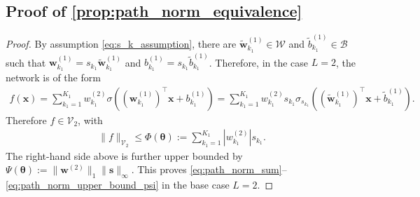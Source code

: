 \documentclass{article}
\def\vtheta{{\bm{\theta}}}
\def\vs{{\bm{s}}}
\def\vw{{\bm{w}}}
\def\vx{{\bm{x}}}
\def\cB{{\mathcal{B}}}
\def\cV{{\mathcal{V}}}
\def\cW{{\mathcal{W}}}
\begin{document}
\begin{appendices}
\subsection{Proof of \cref{prop:path_norm_equivalence}} \label{appendix:proof_path_norm_equivalence}
\begin{proof}
    By assumption \eqref{eq:s_k_assumption}, there are $\widetilde{\vw}_{k_1}^{(1)} \in \cW$ and $\widetilde{b}_{k_1}^{(1)} \in \cB$ such that $\vw_{k_1}^{(1)} = s_{k_1} \widetilde{\vw}_{k_1}^{(1)}$ and $b_{k_1}^{(1)} = s_{k_1} \widetilde{b}_{k_1}^{(1)}$. Therefore, in the case $L = 2$, the network is of the form
    \begin{align} \label{eq:f_L_sigma_scaled}
        f(\vx) = \sum_{k_1=1}^{K_1} w_{k_1}^{(2)} \sigma \left( (\vw_{k_1}^{(1)})^\top \vx + b_{k_1}^{(1)} \right) = \sum_{k_1=1}^{K_1} w_{k_1}^{(2)} s_{k_1} \sigma_{s_{k_1}} \left( ( \widetilde{\vw}_{k_1}^{(1)})^\top \vx + \widetilde{b}_{k_1}^{(1)} \right).
    \end{align}
    Therefore $f \in \cV_2$, with
    \begin{align}
        \| f \|_{\cV_2} \leq \Phi(\vtheta) := \sum_{k_1=1}^{K_1} \left| w_{k_1}^{(2)} \right| s_{k_1}.
    \end{align}
    The right-hand side above is further upper bounded by $\Psi(\vtheta) := \| \vw^{(2)} \|_1 \| \vs \|_\infty$. This proves \eqref{eq:path_norm_sum}--\eqref{eq:path_norm_upper_bound_psi} in the base case $L=2$.
    

\end{proof}
\end{appendices}
\end{document}
